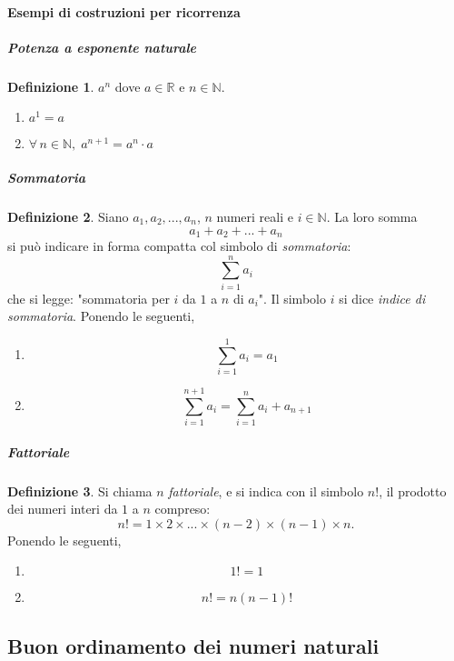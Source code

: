 \documentclass{article}
\theoremstyle{plain}
\theoremstyle{definition}
\newtheorem{defn}{Definizione}[section]
\theoremstyle{remark}
\begin{document}
\paragraph{Esempi di costruzioni per ricorrenza}
\subparagraph{Potenza a esponente naturale}
\begin{bxthm}
\begin{defn}
    $a^n$ dove $a\in\mathbb{R}$ e $n\in\mathbb{N}$.
\begin{enumerate}
    \item $a^1=a $
    \item $\forall\, n\in\mathbb{N},\;a^{n+1}=a^n\cdot a$
\end{enumerate}
\end{defn}
\end{bxthm}
\subparagraph{Sommatoria}
\begin{bxthm}
\begin{defn}
    Siano $a_1,a_2,...,a_n$, $n$ numeri reali e $i\in\mathbb{N}$. La loro somma \[a_1+a_2+...+a_n\]
si può indicare in forma compatta col simbolo di \textit{sommatoria}:
\[\sum_{i=1}^{n}a_i\]
che si legge: "sommatoria per $i$ da $1$ a $n$ di $a_i$". Il simbolo $i$ si dice \textit{indice di sommatoria}.
Ponendo le seguenti, 
\begin{enumerate}
    \item \[\sum_{i=1}^{1}a_i=a_1\]
    \item \[\sum_{i=1}^{n+1}a_i=\sum_{i=1}^{n}a_i+a_{n+1}\]
\end{enumerate}
\end{defn}
\end{bxthm}
\subparagraph{Fattoriale}
\begin{bxthm}
\begin{defn}
    Si chiama $n$ \textit{fattoriale}, e si indica con il simbolo $n!$, il prodotto dei numeri interi da $1$ a $n$ compreso:
\[n!=1\times2\times...\times(n-2)\times(n-1)\times n.\]
Ponendo le seguenti, 
\begin{enumerate}
    \item \[1!=1\]
    \item \[n!=n(n-1)!\]
\end{enumerate}
\end{defn}
\end{bxthm}

\vspace{10pt}

\subsection{Buon ordinamento dei numeri naturali}
\end{document}
